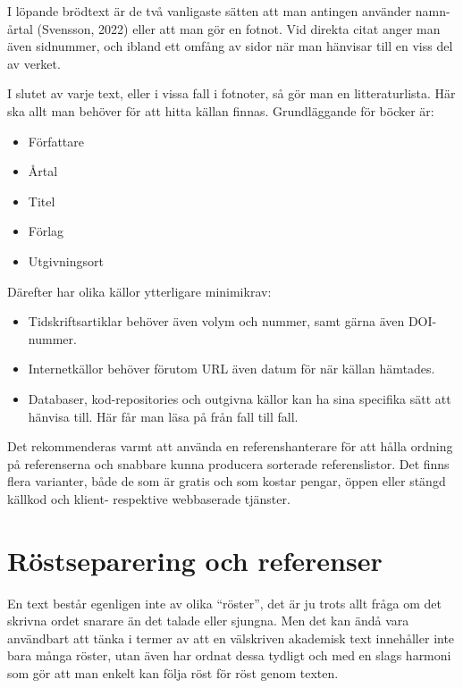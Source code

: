 \documentclass[11pt,a4paper,footinclude=true,headinclude=true]{report} %
\begin{document}
I löpande brödtext är de två vanligaste sätten att man antingen använder namn-årtal (Svensson, 2022) eller att man gör en fotnot. Vid direkta citat anger man även sidnummer, och ibland ett omfång av sidor när man hänvisar till en viss del av verket. 

I slutet av varje text, eller i vissa fall i fotnoter, så gör man en litteraturlista. Här ska allt man behöver för att hitta källan finnas. Grundläggande för böcker är:

\begin{small}
\begin{itemize}
\item Författare
\item Årtal
\item Titel
\item Förlag
\item Utgivningsort
\end{itemize}
\end{small}

\noindent Därefter har olika källor ytterligare minimikrav:

\begin{small}
\begin{itemize}
\item Tidskriftsartiklar behöver även volym och nummer, samt gärna även DOI-nummer.
\item Internetkällor behöver förutom URL även datum för när källan hämtades.
\item  Databaser, kod-repositories och outgivna källor kan ha sina specifika sätt att hänvisa till. Här får man läsa på från fall till fall.
\end{itemize}
\end{small}

\noindent Det rekommenderas varmt att använda en referenshanterare för att hålla ordning på referenserna och snabbare kunna producera sorterade referenslistor. Det finns flera varianter, både de som är gratis och som kostar pengar, öppen eller stängd källkod och klient- respektive webbaserade tjänster. 

\section{Röstseparering och referenser}

En text består egenligen inte av olika ``röster'', det är ju trots allt fråga om det skrivna ordet snarare än det talade eller sjungna. Men det kan ändå vara användbart att tänka i termer av att en välskriven akademisk text innehåller inte bara många röster, utan även har ordnat dessa tydligt och med en slags harmoni som gör att man enkelt kan följa röst för röst genom texten. 
\end{document}
